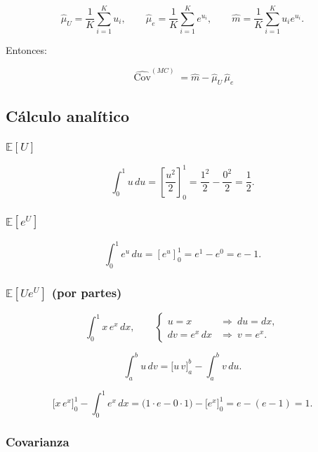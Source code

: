 \documentclass[11pt]{article}
\begin{document}
\[
\widehat{\mu}_U=\frac{1}{K}\sum_{i=1}^{K} u_i,\qquad
\widehat{\mu}_{e}=\frac{1}{K}\sum_{i=1}^{K} e^{u_i},\qquad
\widehat{m}=\frac{1}{K}\sum_{i=1}^{K} u_i e^{u_i}.
\]

Entonces:

\[
\;\widehat{\operatorname{Cov}}^{(MC)}=\widehat{m}-\widehat{\mu}_U\,\widehat{\mu}_{e}\;
\]

    \hypertarget{cuxe1lculo-analuxedtico}{%
\subsection{Cálculo analítico}\label{cuxe1lculo-analuxedtico}}

\hypertarget{mathbbeu}{%
\subsubsection{\texorpdfstring{\(\mathbb{E}[U]\)}{\textbackslash mathbb\{E\}{[}U{]}}}\label{mathbbeu}}

\[
\int_{0}^{1}u\,du=\left[\frac{u^{2}}{2}\right]_{0}^{1}
=\frac{1^{2}}{2}-\frac{0^{2}}{2}=\frac12.
\]

\hypertarget{mathbbeeu}{%
\subsubsection{\texorpdfstring{\(\mathbb{E}[e^{U}]\)}{\textbackslash mathbb\{E\}{[}e\^{}\{U\}{]}}}\label{mathbbeeu}}

\[
\int_{0}^{1}e^{u}\,du=\left[e^{u}\right]_{0}^{1}
=e^{1}-e^{0}=e-1.
\]

\hypertarget{mathbbeueu-por-partes}{%
\subsubsection{\texorpdfstring{\(\mathbb{E}[Ue^{U}]\) (por
partes)}{\textbackslash mathbb\{E\}{[}Ue\^{}\{U\}{]} (por partes)}}\label{mathbbeueu-por-partes}}

\[
\int_{0}^{1} x\,e^{x}\,dx,\qquad
\begin{cases}
u=x &\Rightarrow\ du=dx,\\[2pt]
dv=e^{x}\,dx &\Rightarrow\ v=e^{x}.
\end{cases}
\]

\[
\int_a^b u\,dv=\Big[u\,v\Big]_a^b-\int_a^b v\,du.
\]

\[
\Big[x\,e^{x}\Big]_{0}^{1}-\int_{0}^{1} e^{x}\,dx
=\big(1\cdot e-0\cdot 1\big)-\Big[e^{x}\Big]_{0}^{1}
=e-(e-1)=1.
\]

\hypertarget{covarianza}{%
\subsubsection{Covarianza}\label{covarianza}}
\end{document}
